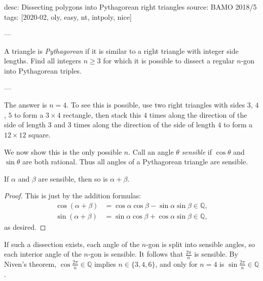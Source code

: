 desc: Dissecting polygons into Pythagorean right triangles
source: BAMO 2018/5
tags: [2020-02, oly, easy, nt, intpoly, nice]

---

A triangle is \emph{Pythagorean} if it is similar to a right triangle with integer side lengths. Find all integers $n\ge3$ for which it is possible to dissect a regular $n$-gon into Pythagorean triples.

---

The answer is $n=4$. To see this is possible, use two right triangles with sides $3$, $4$, $5$ to form a $3\times4$ rectangle, then stack this $4$ times along the direction of the side of length $3$ and $3$ times along the direction of the side of length $4$ to form a $12\times12$ square.

We now show this is the only possible $n$. Call an angle $\theta$ \emph{sensible} if $\cos\theta$ and $\sin\theta$ are both rational. Thus all angles of a Pythagorean triangle are sensible.
\begin{claim*}
    If $\alpha$ and $\beta$ are sensible, then so is $\alpha+\beta$.
\end{claim*}
\begin{proof}
    This is just by the addition formulas:
    \begin{align*}
        \cos(\alpha+\beta)&=\cos\alpha\cos\beta-\sin\alpha\sin\beta\in\mathbb Q,\\
        \sin(\alpha+\beta)&=\sin\alpha\cos\beta+\cos\alpha\sin\beta\in\mathbb Q,
    \end{align*}
    as desired.
\end{proof}

If such a dissection exists, each angle of the $n$-gon is split into sensible angles, so each interior angle of the $n$-gon is sensible. It follows that $\tfrac{2\pi}n$ is sensible. By Niven's theorem, $\cos\tfrac{2\pi}n\in\mathbb Q$ implies $n\in\{3,4,6\}$, and only for $n=4$ is $\sin\tfrac{2\pi}n\in\mathbb Q$.
